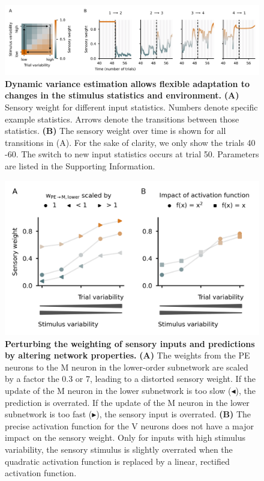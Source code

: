 \documentclass[10pt,a4paper,draft]{article}
\begin{document}
\begin{figure}[!h]
	\centering
    \includegraphics{../results/figures/final/Fig_3_S1}%
\caption{\footnotesize{\bf Dynamic variance estimation allows flexible adaptation to changes in the stimulus statistics and environment. \newline}  
{\bf (A)} Sensory weight for different input statistics. Numbers denote specific example statistics. Arrows denote the transitions between those statistics.
{\bf (B)} The sensory weight over time is shown for all transitions in (A). For the sake of clarity, we only show the trials 40 -60. The switch to new input statistics occurs at trial 50. Parameters are listed in the Supporting Information.
}
\label{fig:Fig_3_S1}
\end{figure}


\begin{figure}[!h]
	\centering
    \includegraphics{../results/figures/final/Fig_3_S2}%
\caption{\footnotesize{\bf Perturbing the weighting of sensory inputs and predictions by altering network properties. \newline}  
{\bf (A)} The weights from the PE neurons to the M neuron in the lower-order subnetwork are scaled by a factor the 0.3 or 7, leading to a distorted sensory weight. If the update of the M neuron in the lower subnetwork is too slow ($\blacktriangleleft$), the prediction is overrated. If the update of the M neuron in the lower subnetwork is too fast ($\blacktriangleright$), the sensory input is overrated.
{\bf (B)} The precise activation function for the V neurons does not have a major impact on the sensory weight. Only for inputs with high stimulus variability, the sensory stimulus is slightly overrated when the quadratic activation function is replaced by a linear, rectified activation function.
}
\label{fig:Fig_3_S2}
\end{figure}
\end{document}
